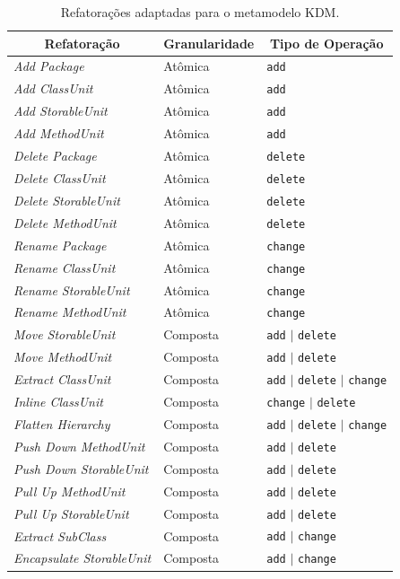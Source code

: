 \begin{table}[h]
\caption{Refatorações adaptadas para o metamodelo KDM.\label{tab:refatoringsCatalogo}}
\begin{center}
\begin{tabular}{ | m{4.5cm} | m{2.5cm} | m{4cm}| } 
\hline
\multicolumn{1}{|c|}{Refatoração} & \multicolumn{1}{|c|}{Granularidade} & \multicolumn{1}{|c|}{Tipo de Operação}\\ 
\hline
\textit{Add Package} &  Atômica & \texttt{add}\\ 
\hline
\textit{Add ClassUnit} &  Atômica & \texttt{add}\\ 
\hline
\textit{Add StorableUnit} &  Atômica & \texttt{add}\\ 
\hline
\textit{Add MethodUnit} &  Atômica & \texttt{add}\\ 
\hline
\textit{Delete Package} &  Atômica & \texttt{delete}\\ 
\hline
\textit{Delete ClassUnit} &  Atômica & \texttt{delete}\\ 
\hline
\textit{Delete StorableUnit} &  Atômica & \texttt{delete}\\ 
\hline
\textit{Delete MethodUnit} &  Atômica & \texttt{delete}\\ 
\hline
\textit{Rename Package} &  Atômica & \texttt{change}\\ 
\hline
\textit{Rename ClassUnit} &  Atômica & \texttt{change}\\ 
\hline
\textit{Rename StorableUnit} &  Atômica & \texttt{change}\\ 
\hline
\textit{Rename MethodUnit} &  Atômica & \texttt{change}\\ 
\hline
\textit{Move StorableUnit} &  Composta & \texttt{add} $|$ \texttt{delete}\\ 
\hline
\textit{Move MethodUnit} &  Composta & \texttt{add} $|$ \texttt{delete}\\ 
\hline
\textit{Extract ClassUnit} &  Composta & \texttt{add} $|$ \texttt{delete} $|$ \texttt{change}\\
\hline
\textit{Inline ClassUnit} &  Composta & \texttt{change} $|$ \texttt{delete}\\ 
\hline
\textit{Flatten Hierarchy} &  Composta & \texttt{add} $|$ \texttt{delete} $|$ \texttt{change}\\ 
\hline
\textit{Push Down MethodUnit} &  Composta & \texttt{add} $|$ \texttt{delete}\\ 
\hline
\textit{Push Down StorableUnit} &  Composta & \texttt{add} $|$ \texttt{delete}\\ 
\hline
\textit{Pull Up MethodUnit} &  Composta & \texttt{add} $|$ \texttt{delete}\\
\hline
\textit{Pull Up StorableUnit} &  Composta & \texttt{add} $|$ \texttt{delete}\\
\hline
\textit{Extract SubClass} &  Composta & \texttt{add} $|$ \texttt{change}\\
\hline
\textit{Encapsulate StorableUnit} &  Composta & \texttt{add} $|$ \texttt{change}\\
\hline
\end{tabular}
\end{center}
\end{table}

